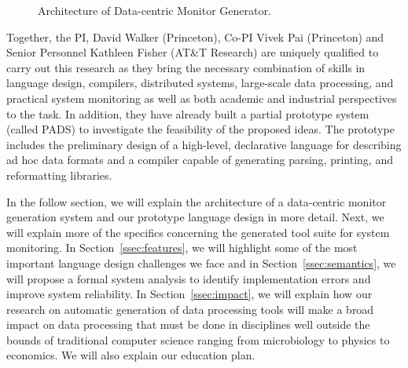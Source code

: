 \begin{figure}[t]
\begin{center}
\centerline{}
\end{center}
\caption{\label{fig:arch} Architecture of Data-centric Monitor Generator.
}
\end{figure}

Together, the PI, David Walker (Princeton), Co-PI Vivek Pai
(Princeton) and Senior Personnel Kathleen Fisher (AT\&T Research) are
uniquely qualified to carry out this research as they bring the
necessary combination of skills in language design, compilers,
distributed systems, large-scale data processing, and practical system
monitoring as well as both academic and industrial perspectives to the
task.  In addition, they have already built a partial prototype system
(called PADS) to investigate the feasibility of the proposed ideas.
The prototype includes the preliminary design of a high-level, declarative
language for describing ad hoc data formats and a compiler capable of
generating parsing, printing, and reformatting libraries.

In the follow section, we will explain 
the architecture of a data-centric monitor generation system
and our prototype language design in more detail.  
Next, we will explain more of the specifics concerning
the generated tool suite for system monitoring.
In Section~\ref{ssec:features}, we will highlight some of the most
important language design challenges we face and
in Section~\ref{ssec:semantics}, we will propose a
formal system analysis to identify implementation errors
and improve system reliability.
In Section~\ref{ssec:impact}, we will explain how our research
on automatic generation of data processing tools
will make a broad impact on data processing that must be done
in disciplines well outside the bounds of
traditional computer science ranging from microbiology to physics to
economics.  We will also explain our education plan.
